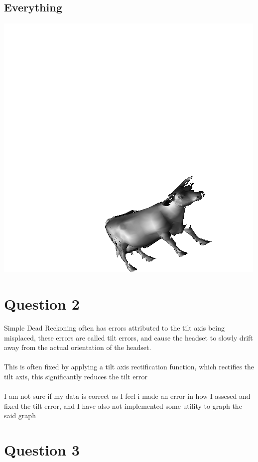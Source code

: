 \documentclass[11pt]{article}
\begin{document}
\subsection{Everything}
\begin{center}\includegraphics{q1}\end{center}


\pagebreak
\section{Question 2}
Simple Dead Reckoning often has errors attributed to the tilt axis being misplaced, these errors are called tilt errors, and cause the headset to slowly drift away from the actual orientation of the headset.\\\\
This is often fixed by applying a tilt axis rectification function, which rectifies the tilt axis, this significantly reduces the tilt error\\\\

I am not sure if my data is correct as I feel i made an error in how I assesed and fixed the tilt error, and I have also not implemented some utility to graph the said graph
\pagebreak
\section{Question 3}
\end{document}
